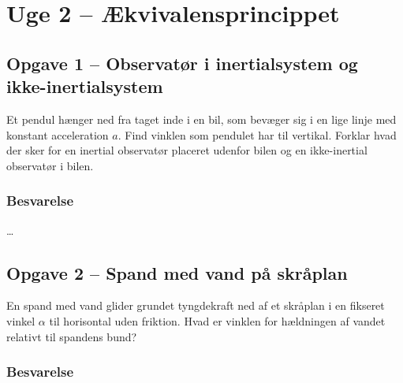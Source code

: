 \documentclass[../main.tex]{subfiles}
\begin{document}

\section{Uge 2 -- Ækvivalensprincippet}
\setcounter{section}{2}



\subsection{Opgave 1 -- Observatør i inertialsystem og ikke-inertialsystem}
\setcounter{subsection}{1}
\setcounter{equation}{0}

Et pendul hænger ned fra taget inde i en bil, som bevæger sig i en lige linje med konstant acceleration $a$. Find vinklen som pendulet har til vertikal. Forklar hvad der sker for en inertial observatør placeret udenfor bilen og en ikke-inertial observatør i bilen.


\subsubsection{Besvarelse}

\ldots




\subsection{Opgave 2 -- Spand med vand på skråplan}
\setcounter{subsection}{2}
\setcounter{equation}{0}

En spand med vand glider grundet tyngdekraft ned af et skråplan i en fikseret vinkel $\alpha$ til horisontal uden friktion. Hvad er vinklen for hældningen af vandet relativt til spandens bund?


\subsubsection*{Besvarelse}
\end{document}
